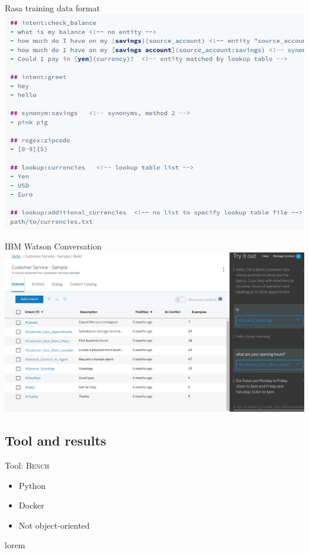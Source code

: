 \documentclass[pdf]{beamer}
\begin{document}
    \begin{frame}{Rasa training data format}
        \includegraphics[width=\textwidth]{figures/rasa_data_format.png}
    \end{frame}

    \begin{frame}{IBM Watson Conversation}
        \hspace*{-1cm}
        \includegraphics[height=0.9\textheight]{figures/watson.png}
    \end{frame}

    \subsection{Tool and results}
    \begin{frame}{Tool: \textsc{Bench}}
        \begin{itemize}
            \item Python
            \item Docker
            \item Not object-oriented\footnotemark
        \end{itemize}
      \end{frame}
      lorem
\end{document}
